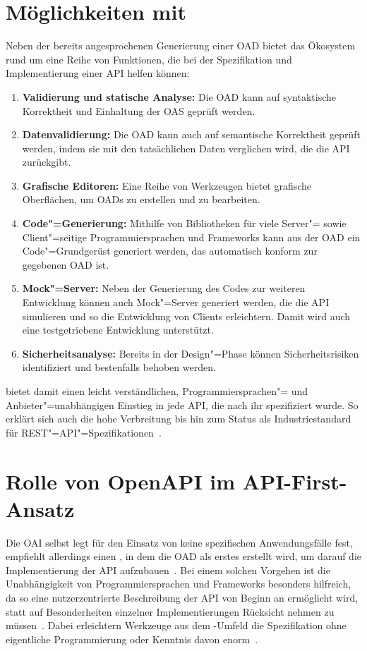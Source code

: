 \section{Möglichkeiten mit \OA}
Neben der bereits angesprochenen Generierung einer \ac{OAD} bietet das Ökosystem rund um \OA eine Reihe von Funktionen, die bei der Spezifikation und Implementierung einer \ac{API} helfen können:
\begin{enumerate}
	\item \textbf{Validierung und statische Analyse:} Die \ac{OAD} kann auf syntaktische Korrektheit und Einhaltung der \ac{OAS} geprüft werden.
	\item \textbf{Datenvalidierung:} Die \ac{OAD} kann auch auf semantische Korrektheit geprüft werden, indem sie mit den tatsächlichen Daten verglichen wird, die die \ac{API} zurückgibt.
	\item \textbf{Grafische Editoren:} Eine Reihe von Werkzeugen bietet grafische Oberflächen, um \acp{OAD} zu erstellen und zu bearbeiten.
	\item \textbf{Code"=Generierung:} Mithilfe von Bibliotheken für viele Server"= sowie Client"=seitige Programmiersprachen und Frameworks kann aus der \ac{OAD} ein Code"=Grundgerüst generiert werden, das automatisch konform zur gegebenen \ac{OAD} ist.
	\item \textbf{Mock"=Server:} Neben der Generierung des Codes zur weiteren Entwicklung können auch Mock"=Server generiert werden, die die \ac{API} simulieren und so die Entwicklung von Clients erleichtern. Damit wird auch eine testgetriebene Entwicklung unterstützt.
	\item \textbf{Sicherheitsanalyse:} Bereits in der Design"=Phase können Sicherheitsrisiken identifiziert und bestenfalls behoben werden.
\end{enumerate}\cite{ope23}

\OA bietet damit einen leicht verständlichen, Programmiersprachen"= und Anbieter"=unabhängigen Einstieg in jede \ac{API}, die nach ihr spezifiziert wurde.
So erklärt sich auch die hohe Verbreitung bis hin zum Status als Industriestandard für \acs{REST}"=\acs{API}"=Spezifikationen~\cite{ope}.

\section{Rolle von OpenAPI im API-First-Ansatz}
Die \ac{OAI} selbst legt für den Einsatz von \OA keine spezifischen Anwendungsfälle fest, empfiehlt allerdings einen \AFA, in dem die \ac{OAD} als erstes erstellt wird, um darauf die Implementierung der \ac{API} aufzubauen~\cites{ope,ope24}.
Bei einem solchen Vorgehen ist die Unabhängigkeit von Programmiersprachen und Frameworks besonders hilfreich, da so eine nutzerzentrierte Beschreibung der \ac{API} von Beginn an ermöglicht wird, statt auf Besonderheiten einzelner Implementierungen Rücksicht nehmen zu müssen~\cite{ope}.
Dabei erleichtern Werkzeuge aus dem \OA-Umfeld die Spezifikation ohne eigentliche Programmierung oder Kenntnis davon enorm~\cites[1629]{cha21}{ope24}.

